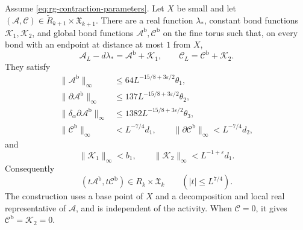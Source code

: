 \begin{proposition}\label{prop:rg-small-polymer-representatives}
Assume \eqref{eq:rg-contraction-parameters}. Let $X$ be small
and let $(\mathscr A,\mathscr C)\in
\widetilde R_{k+1}\times\mathfrak X_{k+1}$.
There are a real function $\lambda_*$, constant bond
functions $\mathscr K_1,\mathscr K_2$, and global bond
functions $\mathscr A^{\mathrm b},\mathscr C^{\mathrm b}$
on the fine torus such that, on every bond with an endpoint
at distance at most $1$ from $X$,
\begin{equation}\label{eq:rg-small-polymer-gauge-identity}
 \mathscr A_L-d\lambda_*=\mathscr A^{\mathrm b}+\mathscr K_1,
 \qquad
 \mathscr C_L=\mathscr C^{\mathrm b}+\mathscr K_2.
\end{equation}
They satisfy
\begin{equation}\label{eq:rg-small-polymer-global-bounds}
 \begin{split}
 \|\mathscr A^{\mathrm b}\|_\infty
          &\le64L^{-15/8+3\varepsilon/2}\theta_1,\\
 \|\partial\mathscr A^{\mathrm b}\|_\infty
          &\le137L^{-15/8+3\varepsilon/2}\theta_2,\\
 \|\delta_\alpha\partial\mathscr A^{\mathrm b}\|_\infty
          &\le1382L^{-15/8+3\varepsilon/2}\theta_3,\\
 \|\mathscr C^{\mathrm b}\|_\infty&<L^{-7/4}d_1,\qquad
 \|\partial\mathscr C^{\mathrm b}\|_\infty<L^{-7/4}d_2,
 \end{split}
\end{equation}
and
\begin{equation}\label{eq:rg-small-polymer-constant-bounds}
 \|\mathscr K_1\|_\infty<b_1,\qquad
 \|\mathscr K_2\|_\infty<L^{-1+\varepsilon}d_1.
\end{equation}
Consequently
\begin{equation}\label{eq:rg-small-polymer-analytic-disk}
 (t\mathscr A^{\mathrm b},t\mathscr C^{\mathrm b})
                       \in R_k\times\mathfrak X_k
                             \qquad(|t|\le L^{7/4}).
\end{equation}
The construction uses a base point of $X$ and a decomposition
and local real representative of $\mathscr A$, and is
independent of the activity. When $\mathscr C=0$, it gives
$\mathscr C^{\mathrm b}=\mathscr K_2=0$.
\end{proposition}

